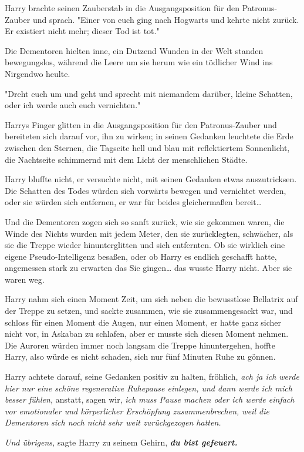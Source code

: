 {Harry brachte seinen Zauberstab in die Ausgangsposition für den Patronus-Zauber und sprach. "Einer von euch ging nach Hogwarts und kehrte nicht zurück. Er existiert nicht mehr; dieser Tod ist tot."

Die Dementoren hielten inne, ein Dutzend Wunden in der Welt standen bewegungslos, während die Leere um sie herum wie ein tödlicher Wind ins Nirgendwo heulte.

"Dreht euch um und geht und sprecht mit niemandem darüber, kleine Schatten, oder ich werde auch euch vernichten."

Harrys Finger glitten in die Ausgangsposition für den Patronus-Zauber und bereiteten sich darauf vor, ihn zu wirken; in seinen Gedanken leuchtete die Erde zwischen den Sternen, die Tagseite hell und blau mit reflektiertem Sonnenlicht, die Nachtseite schimmernd mit dem Licht der menschlichen Städte.

Harry bluffte nicht, er versuchte nicht, mit seinen Gedanken etwas auszutricksen. Die Schatten des Todes würden sich vorwärts bewegen und vernichtet werden, oder sie würden sich entfernen, er war für beides gleichermaßen bereit…

Und die Dementoren zogen sich so sanft zurück, wie sie gekommen waren, die Winde des Nichts wurden mit jedem Meter, den sie zurücklegten, schwächer, als sie die Treppe wieder hinunterglitten und sich entfernten. Ob sie wirklich eine eigene Pseudo-Intelligenz besaßen, oder ob Harry es endlich geschafft hatte, angemessen stark zu erwarten das Sie gingen… das wusste Harry nicht. Aber sie waren weg.

Harry nahm sich einen Moment Zeit, um sich neben die bewusstlose Bellatrix auf der Treppe zu setzen, und sackte zusammen, wie sie zusammengesackt war, und schloss für einen Moment die Augen, nur einen Moment, er hatte ganz sicher nicht vor, in Askaban zu schlafen, aber er musste sich diesen Moment nehmen. Die Auroren würden immer noch langsam die Treppe hinuntergehen, hoffte Harry, also würde es nicht schaden, sich nur fünf Minuten Ruhe zu gönnen.

Harry achtete darauf, seine Gedanken positiv zu halten, fröhlich, \emph{ach ja ich werde hier nur eine schöne regenerative Ruhepause einlegen, und dann werde ich mich besser fühlen,} anstatt, sagen wir, \emph{ich muss Pause machen oder ich werde einfach vor emotionaler und körperlicher Erschöpfung zusammenbrechen, weil die Dementoren sich noch nicht sehr weit zurückgezogen hatten.}

\emph{Und übrigens,} sagte Harry zu seinem Gehirn, \textbf{\emph{du bist gefeuert.}}

}
